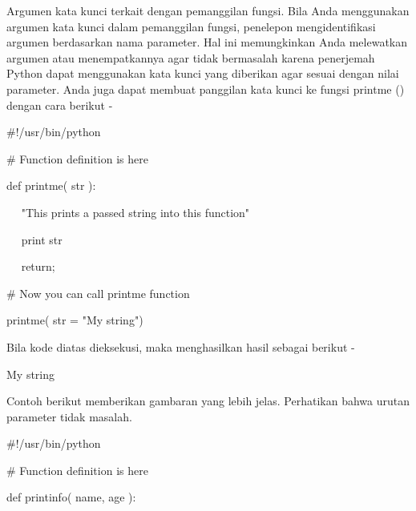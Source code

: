 \noindent 
Argumen kata kunci terkait dengan pemanggilan fungsi. Bila Anda menggunakan argumen kata kunci dalam pemanggilan fungsi, penelepon mengidentifikasi argumen berdasarkan nama parameter. Hal ini memungkinkan Anda melewatkan argumen atau menempatkannya agar tidak bermasalah karena penerjemah Python dapat menggunakan kata kunci yang diberikan agar sesuai dengan nilai parameter. Anda juga dapat membuat panggilan kata kunci ke fungsi printme () dengan cara berikut - \par
\noindent 
 \hspace*{0.5in}  $  \#  $!/usr/bin/python \par
\vspace{12pt}
\noindent 
 \hspace*{0.5in}  $  \#  $ Function definition is here \par
\noindent 
 \hspace*{0.5in} def printme( str ): \par
\noindent 
 \hspace*{0.5in} ~~ "This prints a passed string into this function" \par
\noindent 
 \hspace*{0.5in} ~~ print str \par
\noindent 
 \hspace*{0.5in} ~~ return; \par
\vspace{12pt}
\noindent 
 \hspace*{0.5in}  $  \#  $ Now you can call printme function \par
\noindent 
 \hspace*{0.5in} printme( str = "My string") \par
\noindent 
Bila kode diatas dieksekusi, maka menghasilkan hasil sebagai berikut - \par
\noindent 
 \hspace*{0.5in} My string \par
\noindent 
Contoh berikut memberikan gambaran yang lebih jelas. Perhatikan bahwa urutan parameter tidak masalah. \par
\noindent 
 \hspace*{0.5in}  $  \#  $!/usr/bin/python \par
\vspace{12pt}
\noindent 
 \hspace*{0.5in}  $  \#  $ Function definition is here \par
\noindent 
 \hspace*{0.5in} def printinfo( name, age ): \par
